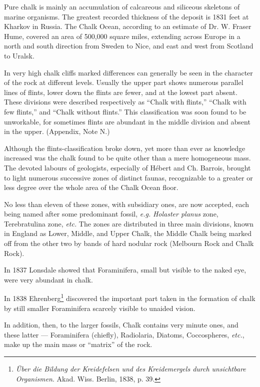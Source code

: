 \documentclass[a4paper, 12pt, oneside]{article}
\begin{document}
Pure chalk is mainly an accumulation of calcareous and siliceous skeletons of marine organisms. The greatest recorded thickness of the deposit is 1831 feet at Kharkov in Russia. The Chalk Ocean, according to an estimate of Dr. W. Fraser Hume, covered an area of 500,000 square miles, extending across Europe in a north and south direction from Sweden to Nice, and east and west from Scotland to Uralsk.

In very high chalk cliffs marked differences can generally be seen in the character of the rock at different levels. Usually the upper part shows numerous parallel lines of flints, lower down the flints are fewer, and at the lowest part absent. These divisions were described respectively as ``Chalk with flints,'' ``Chalk with few flints,'' and ``Chalk without flints.'' This classification was soon found to be unworkable, for sometimes flints are abundant in the middle division and absent in the upper. (Appendix, Note N.)

Although the flints-classification broke down, yet more than ever as knowledge increased was the chalk found to be quite other than a mere homogeneous mass. The devoted labours of geologists, especially of Hébert and Ch. Barrois, brought to light numerous successive zones of distinct faunas, recognizable to a greater or less degree over the whole area of the Chalk Ocean floor.

No less than eleven of these zones, with subsidiary ones, are now accepted, each being named after some predominant fossil, \emph{e.g.} \emph{Holaster planus} zone, Terebratulina zone, \emph{etc.} The zones are distributed in three main divisions, known in England as Lower, Middle, and Upper Chalk, the Middle Chalk being marked off from the other two by bands of hard nodular rock (Melbourn Rock and Chalk Rock).

In 1837 Lonsdale showed that Foraminifera, small but visible to the naked eye, were very abundant in chalk.

In 1838 Ehrenberg\footnote{\emph{Über die Bildung der Kreidefelsen und des Kreidemergels durch unsichtbare Organismen}. Akad. Wiss. Berlin, 1838, p. 39.} discovered the important part taken in the formation of chalk by still smaller Foraminifera scarcely visible to unaided vision.

In addition, then, to the larger fossils, Chalk contains very minute ones, and these latter --- Foraminifera (chiefly), Radiolaria, Diatoms, Coccospheres, \emph{etc.}, make up the main mass or ``matrix'' of the rock.
\end{document}
